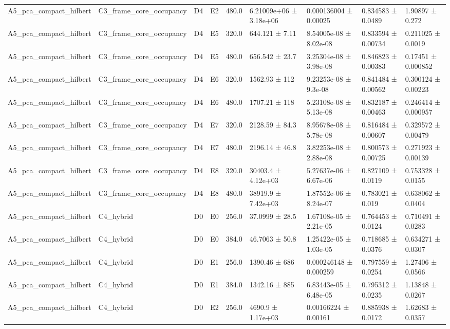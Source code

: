 \begin{table}
\begin{tabular}{lllllllll}
A5\_pca\_compact\_hilbert & C3\_frame\_core\_occupancy & D4 & E2 & 480.0 & 6.21009e+06 ± 3.18e+06 & 0.000136004 ± 0.00025 & 0.834583 ± 0.0489 & 1.90897 ± 0.272 \\
A5\_pca\_compact\_hilbert & C3\_frame\_core\_occupancy & D4 & E5 & 320.0 & 644.121 ± 7.11 & 8.54005e-08 ± 8.02e-08 & 0.833594 ± 0.00734 & 0.211025 ± 0.0019 \\
A5\_pca\_compact\_hilbert & C3\_frame\_core\_occupancy & D4 & E5 & 480.0 & 656.542 ± 23.7 & 3.25304e-08 ± 3.98e-08 & 0.846823 ± 0.00383 & 0.17451 ± 0.000852 \\
A5\_pca\_compact\_hilbert & C3\_frame\_core\_occupancy & D4 & E6 & 320.0 & 1562.93 ± 112 & 9.23253e-08 ± 9.3e-08 & 0.841484 ± 0.00562 & 0.300124 ± 0.00223 \\
A5\_pca\_compact\_hilbert & C3\_frame\_core\_occupancy & D4 & E6 & 480.0 & 1707.21 ± 118 & 5.23108e-08 ± 5.13e-08 & 0.832187 ± 0.00463 & 0.246414 ± 0.000957 \\
A5\_pca\_compact\_hilbert & C3\_frame\_core\_occupancy & D4 & E7 & 320.0 & 2128.59 ± 84.3 & 8.95678e-08 ± 5.78e-08 & 0.816484 ± 0.00607 & 0.329572 ± 0.00479 \\
A5\_pca\_compact\_hilbert & C3\_frame\_core\_occupancy & D4 & E7 & 480.0 & 2196.14 ± 46.8 & 3.82253e-08 ± 2.88e-08 & 0.800573 ± 0.00725 & 0.271923 ± 0.00139 \\
A5\_pca\_compact\_hilbert & C3\_frame\_core\_occupancy & D4 & E8 & 320.0 & 30403.4 ± 4.12e+03 & 5.27637e-06 ± 6.67e-06 & 0.827109 ± 0.0119 & 0.753328 ± 0.0155 \\
A5\_pca\_compact\_hilbert & C3\_frame\_core\_occupancy & D4 & E8 & 480.0 & 38919.9 ± 7.42e+03 & 1.87552e-06 ± 8.24e-07 & 0.783021 ± 0.019 & 0.638062 ± 0.0404 \\
A5\_pca\_compact\_hilbert & C4\_hybrid & D0 & E0 & 256.0 & 37.0999 ± 28.5 & 1.67108e-05 ± 2.21e-05 & 0.764453 ± 0.0124 & 0.710491 ± 0.0283 \\
A5\_pca\_compact\_hilbert & C4\_hybrid & D0 & E0 & 384.0 & 46.7063 ± 50.8 & 1.25422e-05 ± 1.03e-05 & 0.718685 ± 0.0376 & 0.634271 ± 0.0307 \\
A5\_pca\_compact\_hilbert & C4\_hybrid & D0 & E1 & 256.0 & 1390.46 ± 686 & 0.000246148 ± 0.000259 & 0.797559 ± 0.0254 & 1.27406 ± 0.0566 \\
A5\_pca\_compact\_hilbert & C4\_hybrid & D0 & E1 & 384.0 & 1342.16 ± 885 & 6.83443e-05 ± 6.48e-05 & 0.795312 ± 0.0235 & 1.13848 ± 0.0267 \\
A5\_pca\_compact\_hilbert & C4\_hybrid & D0 & E2 & 256.0 & 4690.9 ± 1.17e+03 & 0.00166224 ± 0.00161 & 0.885938 ± 0.0172 & 1.62683 ± 0.0357 \\

\end{tabular}
\end{table}
